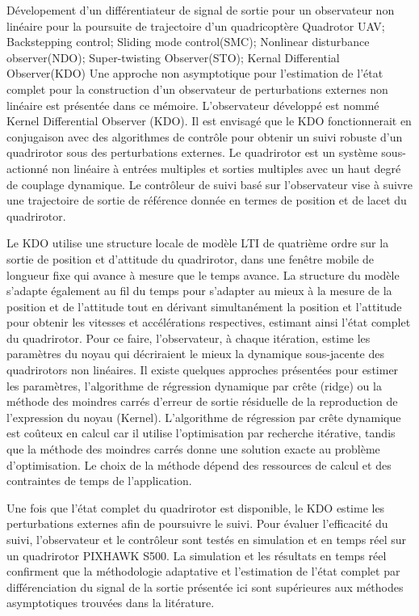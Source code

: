 \documentclass[letterpaper%
, twoside%
, 12pt%
,memoire%
, english%
,creativecommons,hyperref%
]{thETS}
\begin{document}
\begin{summary}{Dévelopement d'un différentiateur de signal de sortie pour un observateur non linéaire pour la poursuite de trajectoire d’un quadricoptère }{Quadrotor UAV; Backstepping control; Sliding mode control(SMC); Nonlinear
disturbance observer(NDO); Super-twisting Observer(STO); Kernal Differential Observer(KDO)}
Une approche non asymptotique pour l'estimation de l'état complet pour la construction d'un observateur de perturbations externes non linéaire est présentée dans ce mémoire. L'observateur développé est nommé Kernel Differential Observer (KDO). Il est envisagé que le KDO fonctionnerait en conjugaison avec des algorithmes de contrôle pour obtenir un suivi robuste d'un quadrirotor sous des perturbations externes. Le quadrirotor est un système sous-actionné non linéaire à entrées multiples et sorties multiples avec un haut degré de couplage dynamique. Le contrôleur de suivi basé sur l'observateur vise à suivre une trajectoire de sortie de référence donnée en termes de position et de lacet du quadrirotor.

Le KDO utilise une structure locale de modèle LTI de quatrième ordre sur la sortie de position et d'attitude du quadrirotor, dans une fenêtre mobile de longueur fixe qui avance à mesure que le temps avance. La structure du modèle s'adapte également au fil du temps pour s'adapter au mieux à la mesure de la position et de l'attitude tout en dérivant simultanément la position et l'attitude pour obtenir les vitesses et accélérations respectives, estimant ainsi l'état complet du quadrirotor. Pour ce faire, l'observateur, à chaque itération, estime les paramètres du noyau qui décriraient le mieux la dynamique sous-jacente des quadrirotors non linéaires. Il existe quelques approches présentées pour estimer les paramètres, l'algorithme de régression dynamique par crête (ridge) ou la méthode des moindres carrés d'erreur de sortie résiduelle de la reproduction de l'expression du noyau (Kernel). L'algorithme de régression par crête dynamique est coûteux en calcul car il utilise l'optimisation par recherche itérative, tandis que la méthode des moindres carrés donne une solution exacte au problème d'optimisation. Le choix de la méthode dépend des ressources de calcul et des contraintes de temps de l'application.

Une fois que l'état complet du quadrirotor est disponible, le KDO estime les perturbations externes afin de poursuivre le suivi. Pour évaluer l'efficacité du suivi, l'observateur et le contrôleur sont testés en simulation et en temps réel sur un quadrirotor PIXHAWK S500. La simulation et les résultats en temps réel confirment que la méthodologie adaptative et l'estimation de l'état complet par différenciation du signal de la sortie présentée ici sont supérieures aux méthodes asymptotiques trouvées dans la litérature.

\end{summary}
\end{document}
